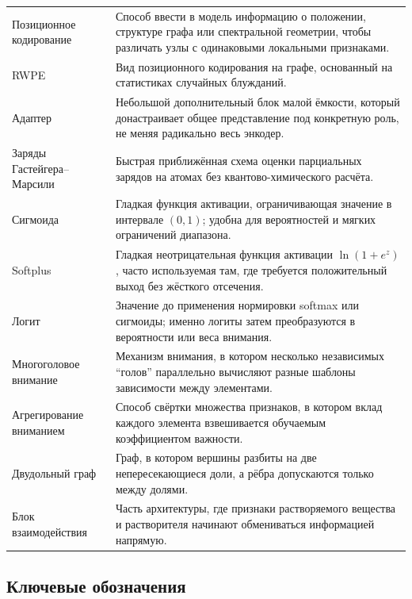 \documentclass[11pt]{article}
\begin{document}
\begin{longtable}{p{}p{}}
Позиционное кодирование & Способ ввести в модель информацию о положении, структуре графа или спектральной геометрии, чтобы различать узлы с одинаковыми локальными признаками. \\
RWPE & Вид позиционного кодирования на графе, основанный на статистиках случайных блужданий. \\
Адаптер & Небольшой дополнительный блок малой ёмкости, который донастраивает общее представление под конкретную роль, не меняя радикально весь энкодер. \\
Заряды Гастейгера--Марсили & Быстрая приближённая схема оценки парциальных зарядов на атомах без квантово-химического расчёта. \\
Сигмоида & Гладкая функция активации, ограничивающая значение в интервале $(0,1)$; удобна для вероятностей и мягких ограничений диапазона. \\
Softplus & Гладкая неотрицательная функция активации $\ln(1+e^z)$, часто используемая там, где требуется положительный выход без жёсткого отсечения. \\
Логит & Значение до применения нормировки softmax или сигмоиды; именно логиты затем преобразуются в вероятности или веса внимания. \\
Многоголовое внимание & Механизм внимания, в котором несколько независимых ``голов'' параллельно вычисляют разные шаблоны зависимости между элементами. \\
Агрегирование вниманием & Способ свёртки множества признаков, в котором вклад каждого элемента взвешивается обучаемым коэффициентом важности. \\
Двудольный граф & Граф, в котором вершины разбиты на две непересекающиеся доли, а рёбра допускаются только между долями. \\
Блок взаимодействия & Часть архитектуры, где признаки растворяемого вещества и растворителя начинают обмениваться информацией напрямую. \\
\end{longtable}

\subsection{Ключевые обозначения}
\end{document}
